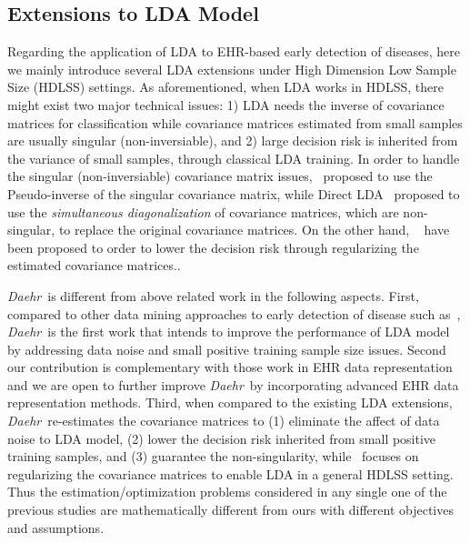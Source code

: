 \documentclass[journal,compsoc]{IEEEtran}
\newcommand{\TheName}{\mbox{\emph{Daehr}}}
\begin{document}
\subsection{Extensions to LDA Model}
Regarding the application of LDA to EHR-based early detection of diseases, here we mainly introduce several LDA extensions under High Dimension Low Sample Size (HDLSS) settings. As aforementioned, when LDA works in HDLSS, there might exist two major technical issues: 1) LDA needs the inverse of covariance matrices for classification while covariance matrices estimated from small samples are usually singular (non-inversiable), and 2) large decision risk is inherited from the variance of small samples, through classical LDA training. In order to handle the singular (non-inversiable) covariance matrix issues,~\cite{ye2004optimization} proposed to use the Pseudo-inverse of the singular covariance matrix, while Direct LDA~\cite{lu2003face,gao2006direct} proposed to use the \emph{simultaneous diagonalization} of covariance matrices, which are non-singular, to replace the original covariance matrices. On the other hand,  ~\cite{clemmensen2011sparse,qiao2008effective,shao2011sparse} have been proposed to order to lower the decision risk through regularizing the estimated covariance matrices..

\TheName\ is different from above related work in the following aspects. First, compared to other data mining approaches to early detection of disease such as~\cite{Lindstrom01032003, riskprediction, zheng_predictive_2015, yoo_data_2011}, \TheName\ is the first work that intends to improve the performance of LDA model by addressing data noise and small positive training sample size issues. Second our contribution is complementary with those work in EHR data representation~\cite{wang_towards_2012, wang_framework_2012, liu_temporal_2015} and we are open to further improve \TheName\ by incorporating advanced EHR data representation methods.
%
Third, when compared to the existing LDA extensions, \TheName\ re-estimates the covariance matrices to (1)  eliminate the affect of data noise to LDA model, (2) lower the decision risk inherited from  small positive training samples, and (3) guarantee the non-singularity, while~\cite{ye2004optimization,lu2003face,gao2006direct,clemmensen2011sparse,qiao2008effective,shao2011sparse} focuses on regularizing the covariance matrices to enable LDA in a general HDLSS setting.  Thus the estimation/optimization problems considered in any single one of the previous studies are mathematically different from ours with different objectives and assumptions.
\end{document}
